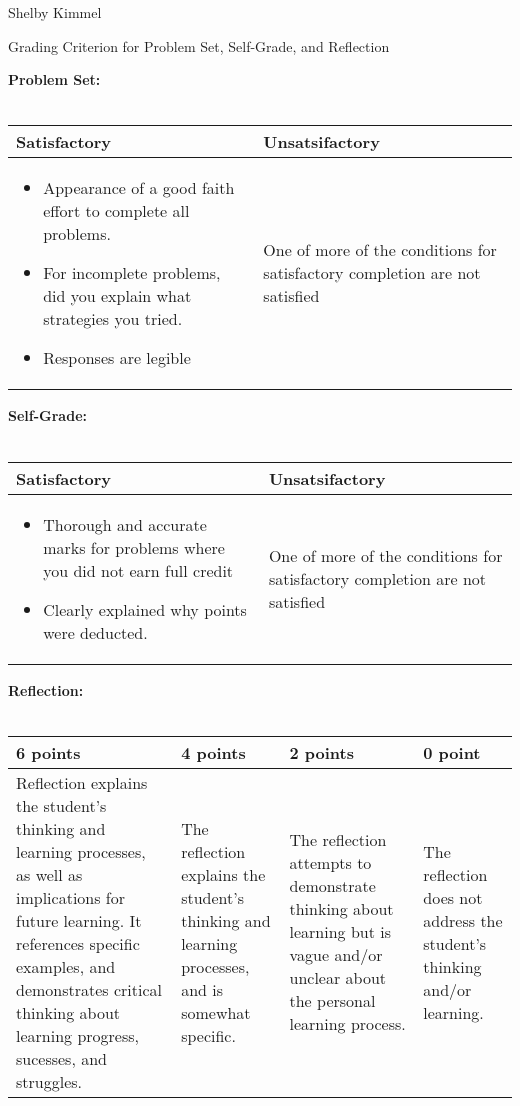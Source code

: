 \documentclass[12pt,landscape]{article}
\begin{document}
\hfill Shelby Kimmel

\begin{center}
{\huge Grading Criterion for Problem Set, Self-Grade, and Reflection}
\end{center}
\bigskip



{\large \textbf{Problem Set:}}\\~\\
{\renewcommand{\arraystretch}{2}
\begin{tabular}{|p{13cm}|p{7cm}|}
\hline
{\bf Satisfactory}& {\bf Unsatsifactory}\\
\hline
\begin{itemize}
\item Appearance of a good faith effort to complete all problems.
\item For incomplete problems, did you explain what strategies you tried.
\item Responses are legible
\end{itemize}
  & One of more of the conditions for satisfactory completion are not satisfied\\
  \hline
\end{tabular}}

\bigskip\bigskip
{\large \textbf{ Self-Grade:}}\\~\\
{\renewcommand{\arraystretch}{2}
\begin{tabular}{|p{13cm}|p{7cm}|}
\hline
{\bf Satisfactory}& {\bf Unsatsifactory}\\
\hline
\begin{itemize}
\item Thorough and accurate marks for problems where you did not earn full credit
\item Clearly explained why points were deducted.
\end{itemize}
  & One of more of the conditions for satisfactory completion are not satisfied\\
  \hline
\end{tabular}}

\newpage
{\large \textbf{ Reflection:}}\\~\\
{\renewcommand{\arraystretch}{2}
\begin{tabular}{|p{5cm}|p{5cm}|p{5cm}|p{5cm}|}
\hline
 {\bf 6 points} & {\bf 4 points} & {\bf 2 points} & {\bf 0 point} \\
\hline

Reflection explains the student's thinking and learning processes, as well as implications for future learning. It references specific examples, and demonstrates critical thinking about learning progress, sucesses, and struggles.& 
The reflection explains the student's thinking and learning processes, and is somewhat specific.&
The reflection attempts to demonstrate thinking about learning but is vague and/or unclear about the personal learning process.&
The reflection does not address the student's thinking and/or learning.\\
\hline
 \end{tabular}
}
\end{document}
